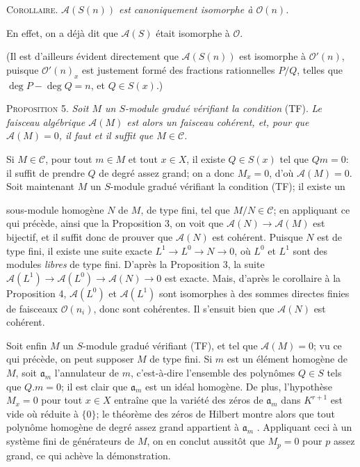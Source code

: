 \textsc{Corollaire}. \textit{$\mathcal{A}(S(n))$ est canoniquement isomorphe à $\mathcal{O}(n)$.}

En effet, on a déjà dit que $\mathcal{A}(S)$ était isomorphe à $\mathcal{O}$.

(Il est d'ailleurs évident directement que $\mathcal{A}(S(n))$ est isomorphe à $\mathcal{O}'(n)$, puisque $\mathcal{O}'(n)_x$ est justement formé des fractions rationnelles $P/Q$, telles que $\deg P - \deg Q = n$, et $Q \in S(x)$.)

\textsc{Proposition} 5. \textit{Soit $M$ un $S$-module gradué vérifiant la condition} (TF). \textit{Le faisceau algébrique $\mathcal{A}(M)$ est alors un faisceau cohérent, et, pour que $\mathcal{A}(M) = 0$, il faut et il suffit que $M \in \mathcal{C}$.}

Si $M \in \mathcal{C}$, pour tout $m \in M$ et tout $x \in X$, il existe $Q \in S(x)$ tel que $Qm = 0$: il suffit de prendre $Q$ de degré assez grand; on a donc $M_x = 0$, d'où $\mathcal{A}(M) = 0$. Soit maintenant $M$ un $S$-module gradué vérifiant la condition (TF); il existe un




 sous-module homogène $N$ de $M$, de type fini, tel que $M/N \in \mathcal{C}$; en appliquant ce qui précède, ainsi que la Proposition 3, on voit que $\mathcal{A}(N) \to \mathcal{A}(M)$ est bijectif, et il suffit donc de prouver que $\mathcal{A}(N)$ est cohérent. Puisque $N$ est de type fini, il existe une suite exacte $L^{1} \to L^{0} \to N \to 0$, où $L^{0}$ et $L^{1}$ sont des modules \textit{libres} de type fini. D'après la Proposition 3, la suite $\mathcal{A}(L^{1}) \to \mathcal{A}(L^{0}) \to \mathcal{A}(N) \to 0$ est exacte. Mais, d'après le corollaire à la Proposition 4, $\mathcal{A}(L^{0})$ et $\mathcal{A}(L^{1})$ sont isomorphes à des sommes directes finies de faisceaux $\mathcal{O}(n_{i})$, donc sont cohérentes. Il s'ensuit bien que $\mathcal{A}(N)$ est cohérent.

Soit enfin $M$ un $S$-module gradué vérifiant (TF), et tel que $\mathcal{A}(M) = 0$; vu ce qui précède, on peut supposer $M$ de type fini. Si $m$ est un élément homogène de $M$, soit $\mathfrak{a}_{m}$ l'annulateur de $m$, c'est-à-dire l'ensemble des polynômes $Q \in S$ tels que $Q.m = 0$; il est clair que $\mathfrak{a}_{m}$ est un idéal homogène. De plus, l'hypothèse $M_{x} = 0$ pour tout $x \in X$ entraîne que la variété des zéros de $\mathfrak{a}_{m}$ dans $K^{r+1}$ est vide où réduite à $\{0\}$; le théorème des zéros de Hilbert montre alors que tout polynôme homogène de degré assez grand appartient à $\mathfrak{a}_{m}$ . Appliquant ceci à un système fini de générateurs de $M$, on en conclut aussitôt que $M_{p} = 0$ pour $p$ assez grand, ce qui achève la démonstration.

